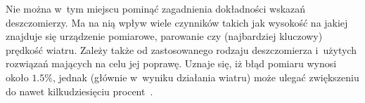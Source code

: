 Nie można w~tym miejscu pominąć zagadnienia dokładności wskazań deszczomierzy. Ma na nią wpływ wiele czynników takich jak wysokość na jakiej znajduje się urządzenie pomiarowe, parowanie czy (najbardziej kluczowy) prędkość wiatru. Zależy także od zastosowanego rodzaju deszczomierza i~użytych rozwiązań mających na celu jej poprawę. Uznaje się, iż błąd pomiaru wynosi około $1.5\%$, jednak (głównie w~wyniku działania wiatru) może ulegać zwiększeniu do nawet kilkudziesięciu procent~\cite{precip_error}.